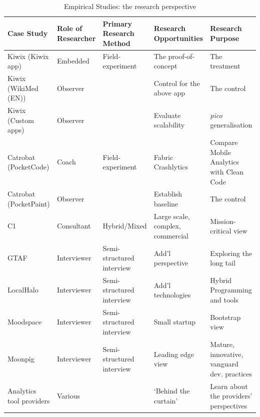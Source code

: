 \begin{landscape} %
\begin{table}
    \centering
    \tabcolsep=0.06cm
    \tiny
    \begin{tabular}{lllll}\toprule
    Case Study                 & Role of Researcher &  Primary Research Method   & Research Opportunities             & Research Purpose \\
    \midrule
    Kiwix (Kiwix app)          & Embedded           & Field-experiment   & The proof-of-concept      & The treatment \\ 
    Kiwix (WikiMed (EN))       & Observer           &                    & Control for the above app & The control  \\
    Kiwix (Custom apps)        & Observer           &                    & Evaluate scalability      & \textit{pico} generalisation \\
    \midrule
    Catrobat (PocketCode)      & Coach              & Field-experiment   & Fabric Crashlytics        & Compare Mobile Analytics with Clean Code \\
    Catrobat (PocketPaint)     & Observer           &                    & Establish baseline        & The control  \\
     \midrule
    C1                         & Consultant         & Hybrid/Mixed & Large scale, complex, commercial & Mission-critical view \\
    \midrule
    GTAF                       & Interviewer        & Semi-structured interview & Add'l perspective & Exploring the long tail \\
    LocalHalo                  & Interviewer        & Semi-structured interview & Add'l technologies & Hybrid Programming and tools \\
    Moodspace                  & Interviewer        & Semi-structured interview & Small startup &Bootstrap view \\
    Moonpig                    & Interviewer        & Semi-structured interview & Leading edge view & Mature, innovative, vanguard dev. practices \\
    \midrule
    Analytics tool providers   & Various            & & `Behind the curtain' & Learn about the providers' perspectives \\
    \bottomrule
    \end{tabular}
    \caption{Empirical Studies: the research perspective}
    \label{tab:empirical-studies-research-perspective}
\end{table}
\end{landscape}

